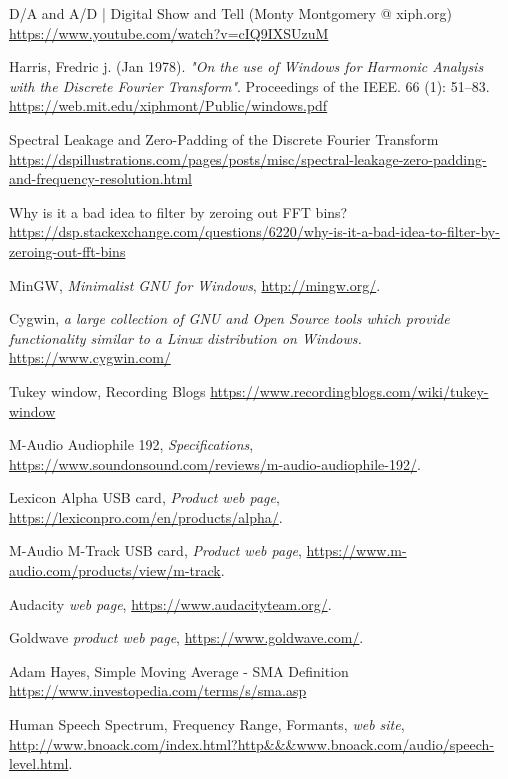 \documentclass[10pt,a4paper]{report}
\begin{document}
\begin{thebibliography}{9}
	D/A and A/D | Digital Show and Tell (Monty Montgomery @ xiph.org)
	\url{https://www.youtube.com/watch?v=cIQ9IXSUzuM}
	
	Harris, Fredric j. (Jan 1978). \textit{"On the use of Windows for Harmonic Analysis with the Discrete Fourier Transform"}. Proceedings of the IEEE. 66 (1): 51–83.
	\url{https://web.mit.edu/xiphmont/Public/windows.pdf}
	
	Spectral Leakage and Zero-Padding of the Discrete Fourier Transform
	\url{https://dspillustrations.com/pages/posts/misc/spectral-leakage-zero-padding-and-frequency-resolution.html}
	
	Why is it a bad idea to filter by zeroing out FFT bins?
	\url{https://dsp.stackexchange.com/questions/6220/why-is-it-a-bad-idea-to-filter-by-zeroing-out-fft-bins}
	
	MinGW, 
	\textit{Minimalist GNU for Windows},
	\url{http://mingw.org/}.
	
	Cygwin,
	\textit{a large collection of GNU and Open Source tools which provide functionality similar to a Linux distribution on Windows.}
	\url{https://www.cygwin.com/}
	
	Tukey window, Recording Blogs
	\url{https://www.recordingblogs.com/wiki/tukey-window}
	
	M-Audio Audiophile 192,
	\textit{Specifications},
	\url{https://www.soundonsound.com/reviews/m-audio-audiophile-192/}.
	
	Lexicon Alpha USB card,
	\textit{Product web page},
	\url{https://lexiconpro.com/en/products/alpha/}.
	
	M-Audio M-Track USB card,
	\textit{Product web page},
	\url{	https://www.m-audio.com/products/view/m-track}.
	
	Audacity
	\textit{web page},
	\url{https://www.audacityteam.org/}.
	
	Goldwave
	\textit{product web page},
	\url{https://www.goldwave.com/}.
	
	Adam Hayes, Simple Moving Average - SMA Definition
	\url{https://www.investopedia.com/terms/s/sma.asp}
	
	Human Speech Spectrum, Frequency Range, Formants, 
	\textit{web site},
	\url{http://www.bnoack.com/index.html?http&&&www.bnoack.com/audio/speech-level.html}.
\end{thebibliography}

\printglossaries
\end{document}
